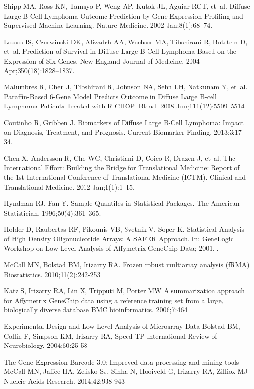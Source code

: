 \documentclass[10pt,letterpaper]{article}
\begin{document}
\begin{thebibliography}{10}
Shipp MA, Ross KN, Tamayo P, Weng AP, Kutok JL, Aguiar RCT, et~al.
\newblock Diffuse Large {B}-Cell Lymphoma Outcome Prediction by Gene-Expression
  Profiling and Supervised Machine Learning.
\newblock Nature Medicine. 2002 Jan;8(1):68--74.

Lossos IS, Czerwinski DK, Alizadeh AA, Wechser MA, Tibshirani R, Botstein D,
  et~al.
\newblock Prediction of Survival in Diffuse Large-{B}-Cell Lymphoma Based on
  the Expression of Six Genes.
\newblock New England Journal of Medicine. 2004 Apr;350(18):1828--1837.

Malumbres R, Chen J, Tibshirani R, Johnson NA, Sehn LH, Natkunam Y, et~al.
\newblock Paraffin-Based 6-Gene Model Predicts Outcome in Diffuse Large
  {B}-cell Lymphoma Patients Treated with {R-CHOP}.
\newblock Blood. 2008 Jun;111(12):5509--5514.

Coutinho R, Gribben J.
\newblock Biomarkers of Diffuse Large {B}-Cell Lymphoma: Impact on Diagnosis,
  Treatment, and Prognosis.
\newblock Current Biomarker Finding. 2013;3:17--34.

Chen X, Andersson R, Cho WC, Christiani D, Coico R, Drazen J, et~al.
\newblock The International Effort: Building the Bridge for Translational
  Medicine: Report of the 1st International Conference of Translational
  Medicine {(ICTM)}.
\newblock Clinical and Translational Medicine. 2012 Jan;1(1):1--15.

Hyndman RJ, Fan Y.
\newblock Sample Quantiles in Statistical Packages.
\newblock The American Statistician. 1996;50(4):361--365.

Holder D, Raubertas RF, Pikounis VB, Svetnik V, Soper K.
\newblock Statistical Analysis of High Density Oligonucleotide Arrays: A SAFER
  Approach.
\newblock In: GeneLogic Workshop on Low Level Analysis of Affymetrix GeneChip
  Data; 2001. .

McCall MN, Bolstad BM, Irizarry RA.
\newblock Frozen robust multiarray analysis (fRMA)
\newblock Biostatistics. 2010;11(2):242-253

Katz S, Irizarry RA, Lin X, Tripputi M, Porter MW
\newblock A summarization approach for Affymetrix GeneChip data using a reference training set from a large, biologically diverse database
\newblock BMC bioinformatics. 2006;7:464

Experimental Design and Low-Level Analysis of Microarray Data
\newblock Bolstad BM, Collin F, Simpson KM, Irizarry RA, Speed TP
\newblock International Review of Neurobiology. 2004;60:25-58

The Gene Expression Barcode 3.0: Improved data processing and mining tools
\newblock McCall MN, Jaffee HA, Zelisko SJ, Sinha N, Hooiveld G, Irizarry RA, Zilliox MJ
\newblock Nucleic Acids Research. 2014;42:938-943
\end{thebibliography}
\end{document}
